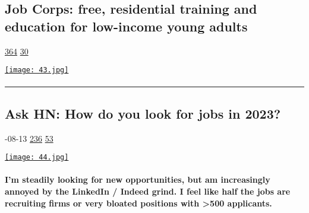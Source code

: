 \documentclass[10pt,a4paper]{article}
\begin{document}
\begin{multicols}{2}
\begin{minipage}{\linewidth}
\subsection{Job Corps: free, residential training and education for low-income young adults}
\textsc{\footnotesize
{\scriptsize\faThumbsOUp}\space 
\href{http://news.ycombinator.com/item?id=37166478\&utm\_term=comment}{364} 
{\scriptsize\faComments}\space 
\href{http://news.ycombinator.com/item?id=37166478\&utm\_term=comment}{30} 
}
\par\medskip\noindent
\href{https://www.jobcorps.gov/?utm\_source=hackernewsletter\&utm\_medium=email\&utm\_term=working}{
    \texttt{[image: 43.jpg]}
}
\end{minipage}
\paragraph{}

\par\noindent\textcolor{red}{\rule{\linewidth}{0.2mm}}
\vfill
\null
\noindent\begin{minipage}{\linewidth}
\subsection{Ask HN: How do you look for jobs in 2023?}
\textsc{\footnotesize
{\scriptsize\faCalendar}-08-13 
{\scriptsize\faThumbsOUp}\space 
\href{http://news.ycombinator.com/item?id=37166478\&utm\_term=comment}{236} 
{\scriptsize\faComments}\space 
\href{http://news.ycombinator.com/item?id=37166478\&utm\_term=comment}{53} 
}
\par\medskip\noindent
\href{https://news.ycombinator.com/item?id=37111256\&utm\_source=hackernewsletter\&utm\_medium=email\&utm\_term=working}{
    \texttt{[image: 44.jpg]}
}
\end{minipage}
\paragraph{}
\textbf{I’m steadily looking for new opportunities, but am increasingly annoyed by the LinkedIn / Indeed grind. I feel like half the jobs are recruiting firms or very bloated positions with >500 applicants.}
\paragraph{}


\end{multicols}
\end{document}
